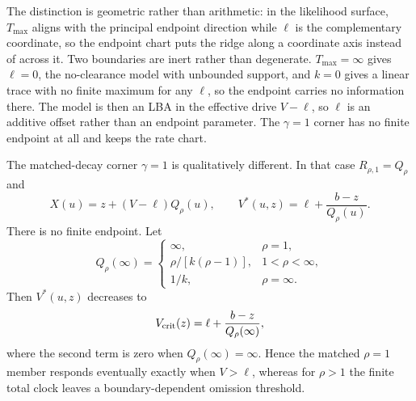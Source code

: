 \documentclass[12pt]{article}
\theoremstyle{remark}
\begin{document}
The distinction is geometric rather than arithmetic: in the likelihood surface, $T_{\max}$ aligns with the principal endpoint direction while $\ell$ is the complementary coordinate, so the endpoint chart puts the ridge along a coordinate axis instead of across it. Two boundaries are inert rather than degenerate. $T_{\max}=\infty$ gives $\ell=0$, the no-clearance model with unbounded support, and $k=0$ gives a linear trace with no finite maximum for any $\ell$, so the endpoint carries no information there. The model is then an LBA in the effective drive $V-\ell$, so $\ell$ is an additive offset rather than an endpoint parameter. The $\gamma=1$ corner has no finite endpoint at all and keeps the rate chart.

The matched-decay corner $\gamma=1$ is qualitatively different. In that case $R_{\rho,1}=Q_\rho$ and
\begin{equation}
 X(u)=z+(V-\ell)Q_\rho(u),\qquad
 V^*(u,z)=\ell+\frac{b-z}{Q_\rho(u)}.
 \label{eq:bawd-matched}
\end{equation}
There is no finite endpoint. Let
\[
 Q_\rho(\infty)=
 \begin{cases}
   \infty,&\rho=1,\\
   \rho/[k(\rho-1)],&1<\rho<\infty,\\
   1/k,&\rho=\infty.
 \end{cases}
\]
Then $V^*(u,z)$ decreases to
\begin{equation}
 V_{\rm crit}(z)=\ell+\frac{b-z}{Q_\rho(\infty)},
 \label{eq:bawd-matched-crit}
\end{equation}
where the second term is zero when $Q_\rho(\infty)=\infty$. Hence the matched $\rho=1$ member responds eventually exactly when $V>\ell$, whereas for $\rho>1$ the finite total clock leaves a boundary-dependent omission threshold.
\end{document}
